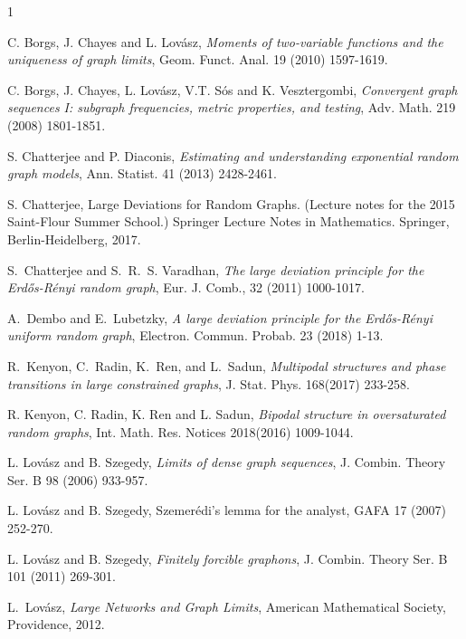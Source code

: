 \documentclass[12pt]{amsart}
\newcommand{\1}{\mathbf{1}}
\begin{document}
\begin{thebibliography}{1}


{\sc C. Borgs, J. Chayes and L. Lov\'{a}sz}, {\em Moments of
  two-variable functions and the uniqueness of graph limits},
  Geom. Funct. Anal. 19 (2010) 1597-1619.

{\sc C. Borgs, J. Chayes, L. Lov\'{a}sz, V.T. S\'os
    and K. Vesztergombi}, {\em Convergent graph sequences I: subgraph
  frequencies, metric properties, and testing}, { Adv. Math.} { 219}
  (2008) 1801-1851.


{\sc S. Chatterjee and P. Diaconis}, {\em Estimating and understanding
exponential random graph models}, Ann. Statist. 41 (2013) 2428-2461.

 S. Chatterjee,
  Large Deviations for Random Graphs. (Lecture notes for the 2015
  Saint-Flour Summer School.) Springer Lecture Notes in
  Mathematics. Springer, Berlin-Heidelberg, 2017.


{\sc S.~Chatterjee and S.~R.~S. Varadhan}, {\em The large deviation principle
  for the {Erd\H{o}s-R\'{e}nyi} random graph}, Eur. J. Comb., 32
(2011) 1000-1017.

 {\sc A.\ Dembo and E.\ Lubetzky},
{\em A large deviation principle for the Erd\H{o}s-R\'{e}nyi
uniform random graph}, Electron. Commun. Probab. 23 (2018) 1-13.


{\sc R.~Kenyon, C.~Radin, K.~Ren, and L.~Sadun}, {\em Multipodal structures and
  phase transitions in large constrained graphs}, J. Stat. Phys. 168(2017) 233-258.

{\sc R. Kenyon, C. Radin, K. Ren and L. Sadun}, {\em Bipodal structure in
  oversaturated random graphs}, Int. Math. Res. Notices 2018(2016)
1009-1044.


{\sc L. Lov\'{a}sz  and  B. Szegedy},
{\em Limits of dense graph sequences}, 
{ J. Combin. Theory Ser. B} { 98} (2006)  933-957.

{\sc L. Lov\'{a}sz  and  B. Szegedy},
Szemer\'edi's lemma for the analyst,
{ GAFA} { 17} (2007)  252-270.

{\sc L. Lov\'{a}sz  and  B. Szegedy},
{\em Finitely forcible graphons},
{ J. Combin. Theory Ser. B} {101} (2011) 269-301.


{\sc L.~Lov\'asz}, {\em Large Networks and Graph Limits}, American Mathematical
  Society, Providence, 2012.


\end{thebibliography}
\end{document}
